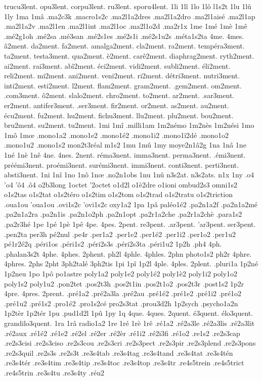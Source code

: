 {trucu3lent.
opu3lent.
corpu3lent.
ru3lent.
sporu4lent.
1li
1lî
1lo
1lô
l1s2t
1lu
1lû
1ly
1ma
1mâ
.ma2c3k
.macro1s2c
.ma2l1a2dres
.ma2l1a2dro
.ma2l1aisé
.ma2l1ap
.ma2l1a2v
.ma2l1en
.ma2l1int
.ma2l1oc
.ma2l1o2d
.ma2r1x
1me
1mé
1mè
1mê
.mé2g1oh
.mé2sa
.mé3san
.mé2s1es
.mé2s1i
.mé2s1u2s
.méta1s2ta
4me.
4mes.
â2ment.
da2ment.
fa2ment.
amalga2ment.
cla2ment.
ra2ment.
tempéra3ment.
ta2ment.
testa3ment.
qua2ment.
è2ment.
carê2ment.
diaphrag2ment.
ryth2ment.
ai2ment.
rai3ment.
abî2ment.
éci2ment.
vidi2ment.
subli2ment.
éli2ment.
reli2ment.
mi2ment.
ani2ment.
veni2ment.
ri2ment.
détri3ment.
nutri3ment.
inti2ment.
esti2ment.
l2ment.
flam2ment.
gram2ment.
.gem2ment.
om2ment.
.com3ment.
ô2ment.
slalo2ment.
chro2ment.
to2ment.
ar2ment.
.sar3ment.
er2ment.
antifer3ment.
.ser3ment.
fir2ment.
or2ment.
as2ment.
au2ment.
écu2ment.
fu2ment.
hu2ment.
fichu3ment.
llu2ment.
plu2ment.
bou2ment.
bru2ment.
su2ment.
tu2ment.
1mi
1mî
.milli1am
1m2némo
1m2nès
1m2nési
1mo
1mô
1mœ
.mono1a2
.mono1e2
.mono1é2
.mono1i2
.mono1ï2dé
.mono1o2
.mono1u2
.mono1s2
mon2t3réal
m1s2
1mu
1mû
1my
moye2n1â2g
1na
1nâ
1ne
1né
1nè
1nê
4ne.
4nes.
2nent.
réma3nent.
imma3nent.
perma3nent.
.émi3nent.
préémi3nent.
proémi3nent.
surémi3nent.
immi3nent.
conti3nent.
perti3nent.
absti3nent.
1ni
1nî
1no
1nô
1nœ
.no2n1obs
1nu
1nû
n3s2at.
n3s2ats.
n1x
1ny
.o4
'o4
'ô4
.ô4
o2b3long
1octet
'2octet
o1d2l
o1è2dre
o1ioni
ombud2s3
omni1s2
o1s2tas
o1s2tat
o1s2téro
o1s2tim
o1s2tom
o1s2trad
o1s2tratu
o1s2triction
.oua1ou
'oua1ou
.ovi1s2c
'ovi1s2c
oxy1a2
1pa
1pâ
paléo1é2
.pa2n1a2f
.pa2n1a2mé
.pa2n1a2ra
.pa2n1is
.pa2n1o2ph
.pa2n1opt
.pa2r1a2che
.pa2r1a2chè
.para1s2
.pa2r3hé
1pe
1pé
1pè
1pê
4pe.
4pes.
2pent.
re3pent.
.ar3pent.
'ar3pent.
ser3pent.
.pen2ta
per3h
pé2nul
.pe4r
.per1a2
.per1e2
.per1é2
.per1i2
.per1o2
.per1u2
pé1r2é2q
.péri1os
.péri1s2
.péri2s3s
.péri2s3ta
.péri1u2
1p2h
.ph4
4ph.
.phalan3s2t
4phe.
4phes.
2phent.
ph2l
4phle.
4phles.
2phn
photo1s2
ph2r
4phre.
4phres.
2phs
2pht
3ph2talé
3ph2tis
1pi
1pî
1p2l
4ple.
4ples.
2plent.
.pluri1a
1p2né
1p2neu
1po
1pô
po1astre
poly1a2
poly1e2
poly1é2
poly1è2
poly1i2
poly1o2
poly1s2
poly1u2
.pon2tet
.pos2t3h
.pos2t1in
.pos2t1o2
.pos2t3r
.post1s2
1p2r
4pre.
4pres.
2prent.
.pré1a2
.pré2a3la
.pré2au
.pré1é2
.pré1e2
.pré1i2
.pré1o2
.pré1u2
.pré1s2
.pro1é2
.pro1s2cé
pro2s3tat
.prou3d2h
1p2sych
.psycho1a2n
1p2tèr
1p2tér
1pu
.pud1d2l
1pû
1py
1q
4que.
4ques.
2quent.
é3quent.
élo3quent.
grandilo3quent.
1ra
1râ
radio1a2
1re
1ré
1rè
1rê
.ré1a2
.ré2a3le
.ré2a3lis
.ré2a3lit
.ré2aux
.ré1é2
.ré1e2
.ré2el
.ré2er
.ré2èr
.ré1i2
.ré2i3fi
.ré1o2
.re1s2
.re2s3cap
.re2s3cisi
.re2s3ciso
.re2s3cou
.re2s3cri
.re2s3pect
.re2s3pir
.re2s3plend
.re2s3pons
.re2s3quil
.re2s3s
.re2s3t
.re3s4tab
.re3s4tag
.re3s4tand
.re3s4tat
.re3s4tén
.re3s4tér
.re3s4tim
.re3s4tip
.re3s4toc
.re3s4top
.re3s4tr
.re4s5trein
.re4s5trict
.re4s5trin
.re3s4tu
.re3s4ty
.réu2

}
